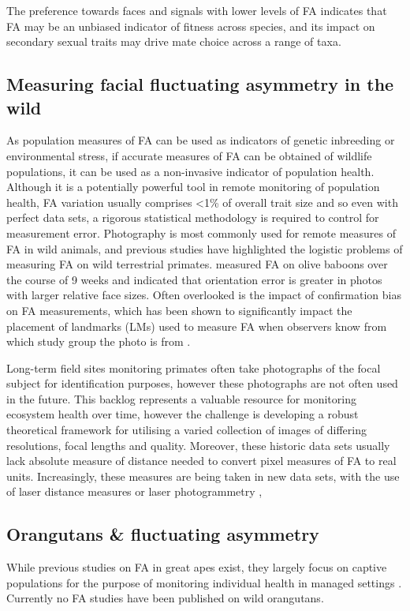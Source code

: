 The preference towards faces and signals with lower levels of FA indicates that FA may be an unbiased indicator of fitness across species, and its impact on secondary sexual traits may drive mate choice across a range of taxa. 

\subsection{Measuring facial fluctuating asymmetry in the wild}

As population measures of FA can be used as indicators of genetic inbreeding or environmental stress, if accurate measures of FA can be obtained of wildlife populations, it can be used as a non-invasive indicator of population health.  Although it is a potentially powerful tool in remote monitoring of population health, FA variation usually comprises <1\% of overall trait size and so even with perfect data sets, a rigorous statistical methodology is required to control for measurement error. Photography is most commonly used for remote measures of FA in wild animals, and previous studies have highlighted the logistic problems of measuring FA on wild terrestrial primates. \citet{Boulton.2013} measured FA on olive baboons over the course of 9 weeks and indicated that orientation error is greater in photos with larger relative face sizes. Often overlooked is the impact of confirmation bias on FA measurements, which has been shown to significantly impact the placement of landmarks (LMs) used to measure FA when observers know from which study group the photo is from \citep{Kozlov.2015}.

Long-term field sites monitoring primates often take photographs of the focal subject for identification purposes, however these photographs are not often used in the future. This backlog represents a valuable resource for monitoring ecosystem health over time, however the challenge is developing a robust theoretical framework for utilising a varied collection of images of differing resolutions, focal lengths and quality. Moreover, these historic data sets usually lack absolute measure of distance needed to convert pixel measures of FA to real units. Increasingly, these measures are being taken in new data sets, with the use of laser distance measures or laser photogrammetry \citep{Brown.2022rho, Galbany.2017, Boulton.2013}, 

\subsection{Orangutans \& fluctuating asymmetry}
While previous studies on FA in great apes exist, they largely focus on captive populations for the purpose of monitoring individual health in managed settings \citep{Sefcek.2007akp}. Currently no FA studies have been published on wild orangutans.

